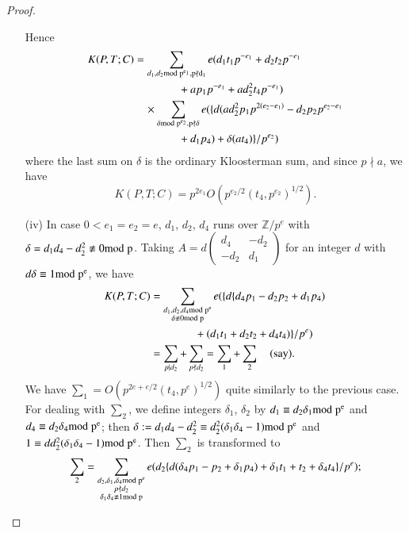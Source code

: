 \begin{proof}
\begin{itemize}
Hence
\begin{align*}
K(P,T;C) &= \sum_{d_{1},d_{2}\rm{mod} \; p^{e_{1}},p\nmid d_{1}}
e(d_{1}t_{1}p^{-e_{1}}+d_{2}t_{2}p^{-e_{1}}\\
&\qquad\qquad +ap_{1}p^{-e_{1}}+ad^{2}_{2}t_{4}p^{-e_{1}})\\
&\quad \times \sum_{\delta \rm{mod} \; p^{e_2},p\nmid \delta} 
e(\{d(ad^{2}_{2}p_{1}p^{2(e_{2}-e_{1})}-d_{2}p_{2}
p^{e_{2}-e_{1}}\\
&\qquad\qquad +d_{1}p_{4})+\delta(at_{4})\}/p^{e_{2}})
\end{align*}
where the last sum on $\delta$ is the ordinary Kloosterman sum, and
since $p\nmid a$, we have
$$
K(P,T;C)=p^{2e_{1}}O(p^{e_{2}/2}(t_{4},p^{e_{2}})^{1/2}).
$$

\item[(iv)] In case $0<e_{1}=e_{2}=e$, $d_{1}$, $d_{2}$, $d_{4}$ runs
  over $\mathbb{Z}/p^{e}$ with $\delta=d_{1}d_{4}-d^{2}_{2}\not\equiv
  0\rm{mod} \; p$. Taking $A=d\left(\begin{smallmatrix} d_{4} &
    -d_{2}\\ -d_{2} & d_{1}  \end{smallmatrix}\right)$ for an integer
  $d$ with\pageoriginale $d\delta\equiv 1\rm{mod} \; p^{e}$, we have
\begin{align*}
K(P,T;C) &= \sum_{\substack{d_{1},d_{2},d_{4}\rm{mod} \;
    p^{e}\\ \delta\not\equiv 0 \rm{mod} \;
    p}}e(\{d\{d_{4}p_{1}-d_{2}p_{2}+d_{1}p_{4})\\
&\qquad\qquad+(d_{1}t_{1}+d_{2}t_{2}+d_{4}t_{4})\}/p^{e})\\
&= \sum_{p|d_{2}}+\sum_{p\nmid d_{2}}=\sum_{1}+\sum_{2}\quad\text{(say).}
\end{align*}
We have $\sum\limits_{1}=O(p^{2e+e/2}(t_{4},p^{e})^{1/2})$ quite
similarly to the previous case. For dealing with $\sum_{2}$, we define
integers $\delta_{1}$, $\delta_{2}$ by $d_{1}\equiv
d_{2}\delta_{1}\rm{mod} \; p^{e}$ and $d_{4}\equiv d_{2}\delta_{4}\rm{mod} \;
p^{e}$; then $\delta:=d_{1}d_{4}-d^{2}_{2}\equiv
d^{2}_{2}(\delta_{1}\delta_{4}-1)\rm{mod} \; p^{e}$ and $1\equiv
dd^{2}_{2}(\delta_{1}\delta_{4}-1)\rm{mod} \; p^{e}$. Then $\sum_{2}$ is
transformed to 
$$
\sum_{2} =\sum_{\substack{d_{2},\delta_{1},\delta_{4}\rm{mod} \;
    p^{e}\\ p\nmid d_{2}\\ \delta_{1}\delta_{4}\not\equiv 1\rm{mod} \;
    p}}e(d_{2}\{d(\delta_{4}p_{1}-p_{2}+\delta_{1}p_{4})+\delta_{1}t_{1}+t_{2}+\delta_{4}t_{4}\}/p^{e}); 
$$
\end{itemize}
\end{proof}
